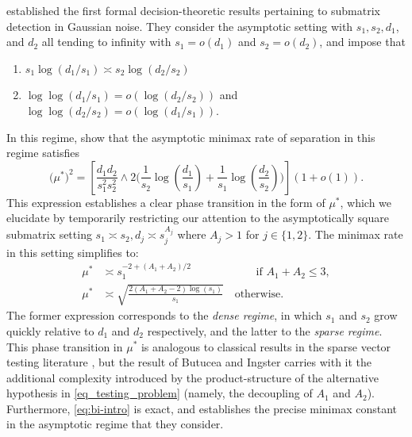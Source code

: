 \documentclass{article}
\theoremstyle{remark}
\begin{document}
\citet{butucea2013detection} established the first formal decision-theoretic results pertaining to submatrix detection in Gaussian noise. They consider the asymptotic setting with $s_1, s_2, d_1$, and $d_2$ all tending to infinity with $s_1 = o(d_1)$ and $s_2 = o(d_2)$, and impose that 
\begin{enumerate}
    \item $s_1 \log(d_1/s_1) \asymp s_2 \log(d_2/s_2)$ 
    \item $\log \log (d_1/s_1) = o(\log(d_2/s_2))$ and $\log \log (d_2/s_2) = o(\log(d_1/s_1))$.
\end{enumerate}
In this regime, \citet{butucea2013detection} show that the asymptotic minimax rate of separation in this regime satisfies
\begin{equation}\label{eq:bi-intro}
    \big(\mu^*\big)^2 = \left[\frac{d_1d_2}{s_1^2s_2^2} \land 2 \Bigg(\frac{1}{s_2}\log\left(\frac{d_1}{s_1}\right) + \frac{1}{s_1}\log\left(\frac{d_2}{s_2}\right)\Bigg)\right](1+o(1)).
\end{equation}
This expression establishes a clear phase transition in the form of $\mu^*$, which we elucidate by temporarily restricting our attention to the asymptotically square submatrix setting $s_1 \asymp s_2, d_j \asymp s_j^{A_j}$ where $A_j > 1$ for $j \in \{1,2\}$. The minimax rate in this setting simplifies to:
\begin{align*}
    \mu^* &\asymp s_1^{-2 + (A_1 + A_2)/2} \quad \quad \quad \quad \quad  \; \; \;\text{if $A_1 + A_2 \leq 3$}, \\
    \mu^* &\asymp \sqrt{\frac{2(A_1 + A_2 - 2)\log(s_1)}{s_1}} \quad \text{otherwise.}
\end{align*}
The former expression corresponds to the \textit{dense regime}, in which $s_1$ and $s_2$ grow quickly relative to $d_1$ and $d_2$ respectively, and the latter to the \textit{sparse regime}. This phase transition in $\mu^*$ is analogous to classical results in the sparse vector testing literature \citep{ingster1996some, donoho2004higher}, but the result of Butucea and Ingster carries with it the additional complexity introduced by the product-structure of the alternative hypothesis in \eqref{eq_testing_problem} (namely, the decoupling of $A_1$ and $A_2$). Furthermore, \eqref{eq:bi-intro} is exact, and establishes the precise minimax constant in the asymptotic regime that they consider.
\end{document}
